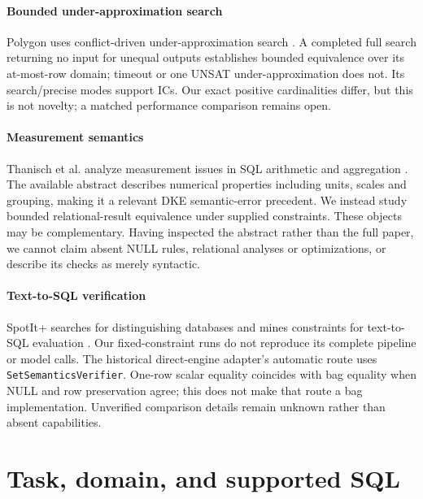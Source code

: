 \documentclass[3p,times,authoryear]{elsarticle}
\begin{document}
\paragraph{Bounded under-approximation search}
Polygon uses conflict-driven under-approximation search \citep{zhao2025polygon}. A completed full search returning no input for unequal outputs establishes bounded equivalence over its at-most-row domain; timeout or one UNSAT under-approximation does not. Its search/precise modes support ICs. Our exact positive cardinalities differ, but this is not novelty; a matched performance comparison remains open.

\paragraph{Measurement semantics}
Thanisch et al. analyze measurement issues in SQL arithmetic and aggregation \citep{thanisch2019measurement}. The available abstract describes numerical properties including units, scales and grouping, making it a relevant DKE semantic-error precedent. We instead study bounded relational-result equivalence under supplied constraints. These objects may be complementary. Having inspected the abstract rather than the full paper, we cannot claim absent NULL rules, relational analyses or optimizations, or describe its checks as merely syntactic.

\paragraph{Text-to-SQL verification}
SpotIt+ searches for distinguishing databases and mines constraints for text-to-SQL evaluation \citep{tremante2026spotit}. Our fixed-constraint runs do not reproduce its complete pipeline or model calls. The historical direct-engine adapter's automatic route uses \texttt{SetSemanticsVerifier}. One-row scalar equality coincides with bag equality when NULL and row preservation agree; this does not make that route a bag implementation. Unverified comparison details remain unknown rather than absent capabilities.

\section{Task, domain, and supported SQL}\label{sec:task}
\end{document}
